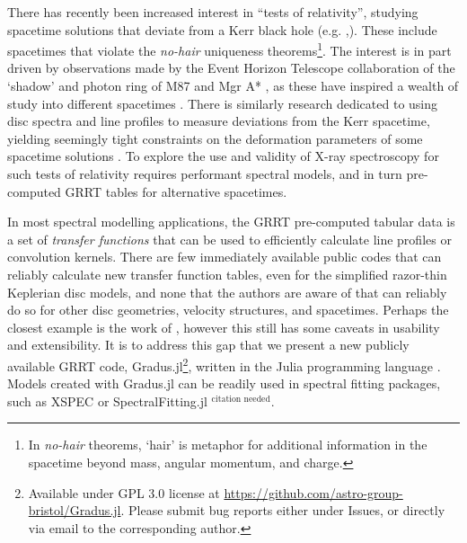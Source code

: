 \documentclass[fleqn,usenatbib]{mnras}
\newcommand{\citneeded}{{\bf \color{red} $^{\text{citation needed}}$}}
\newcommand{\software}[1]{{\sc #1}}
\newcommand{\Gradus}{\software{Gradus.jl}\xspace}
\begin{document}
There has recently been increased interest in ``tests of relativity'', studying
spacetime solutions that deviate from a Kerr black hole (e.g.
\citealt{johannsen_testing_2010, chrusciel_stationary_2012, bambi_testing_2022,
patra_accretion_2023, chen_observational_2024},). These include spacetimes that
violate the \textit{no-hair} uniqueness theorems\footnote{In \emph{no-hair}
theorems, `hair' is metaphor for additional information in the spacetime beyond
mass, angular momentum, and charge.}. The interest is in part driven by
observations made by the Event Horizon Telescope collaboration of the `shadow'
and photon ring of M87 and Mgr A*
\citep{the_event_horizon_telescope_collaboration_first_2019,
the_event_horizon_telescope_collaboration_first_2023}, as these have inspired a
wealth of study into different spacetimes \citep[see][]{eht_non_kerr_2022}.
There is similarly research dedicated to using disc spectra and line profiles to
measure deviations from the Kerr spacetime, yielding seemingly tight constraints
on the deformation parameters of some spacetime solutions
\citep[e.g.][]{bambi_precision_measuremets_2021}. To explore the use and
validity of X-ray spectroscopy for such tests of relativity requires performant
spectral models, and in turn pre-computed GRRT tables for alternative
spacetimes.

In most spectral modelling applications, the GRRT pre-computed tabular data is a
set of \textit{transfer functions} that can be used to efficiently calculate
line profiles or convolution kernels. There are few immediately available public
codes that can reliably calculate new transfer function tables, even for the
simplified razor-thin Keplerian disc models, and none that the authors are aware
of that can reliably do so for other disc geometries, velocity structures, and
spacetimes. Perhaps the closest example is the work of
\citep{taylor_exploring_2018}, however this still has some caveats in usability
and extensibility. It is to address this gap that we present a new publicly
available GRRT code, Gradus.jl\footnote{Available under GPL 3.0 license at
\url{https://github.com/astro-group-bristol/Gradus.jl}. Please submit bug
reports either under Issues, or directly via email to the corresponding
author.}, written in the Julia programming language
\citep{Bezanson_Julia_A_fresh_2017}. Models created with \Gradus can be readily
used in spectral fitting packages, such as \software{XSPEC}
\citep{arnaud_xspec_1996} or \software{SpectralFitting.jl} \citneeded.

\end{document}
